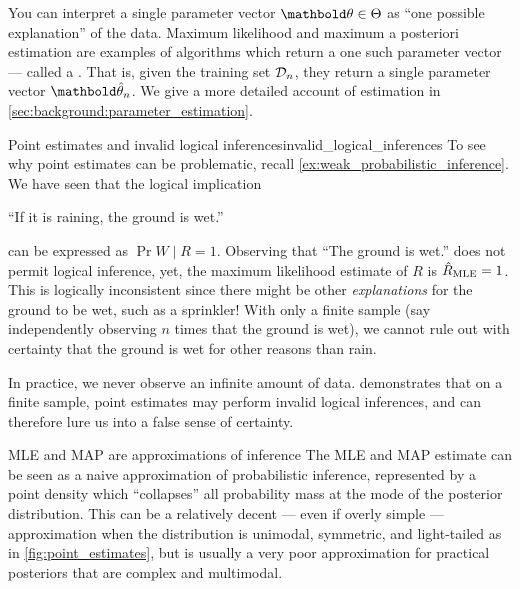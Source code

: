 You can interpret a single parameter vector $\vtheta \in \Theta$ as ``one possible explanation'' of the data.
Maximum likelihood and maximum a posteriori estimation are examples of  algorithms which return a one such parameter vector --- called a .
That is, given the training set $\mathcal{D}_n$, they return a single parameter vector $\vthetahat_n$.
We give a more detailed account of estimation in \cref{sec:background:parameter_estimation}.

\begin{ex}{Point estimates and invalid logical inferences}{invalid_logical_inferences}
  To see why point estimates can be problematic, recall \cref{ex:weak_probabilistic_inference}.
  We have seen that the logical implication \begin{center}
    ``If it is raining, the ground is wet.''
  \end{center} can be expressed as $\Pr{W \mid R} = 1$.
  Observing that ``The ground is wet.'' does not permit logical inference, yet, the maximum likelihood estimate of $R$ is $\hat{R}_{\mathrm{MLE}} = 1$.
  This is logically inconsistent since there might be other \emph{explanations} for the ground to be wet, such as a sprinkler!
  With only a finite sample (say independently observing $n$ times that the ground is wet), we cannot rule out with certainty that the ground is wet for other reasons than rain.
\end{ex}

In practice, we never observe an infinite amount of data.
 demonstrates that on a finite sample, point estimates may perform invalid logical inferences, and can therefore lure us into a false sense of certainty.

\begin{rmk}{MLE and MAP are approximations of inference}{}
  The MLE and MAP estimate can be seen as a naive approximation of probabilistic inference, represented by a point density which ``collapses'' all probability mass at the mode of the posterior distribution.
  This can be a relatively decent --- even if overly simple --- approximation when the distribution is unimodal, symmetric, and light-tailed as in \cref{fig:point_estimates}, but is usually a very poor approximation for practical posteriors that are complex and multimodal.
\end{rmk}

\begin{marginfigure}
  \caption{A the MLE/MAP are point estimates at the mode $\hat{\theta}$ of the posterior distribution $p(\theta \mid \spD)$.}
  \label{fig:point_estimates}
\end{marginfigure}

